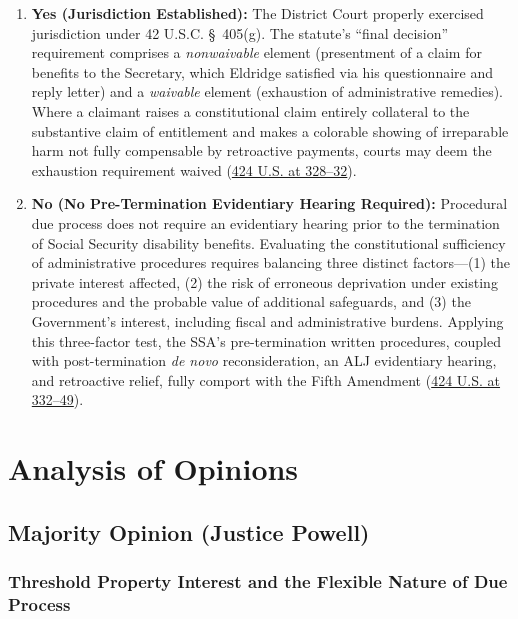 \documentclass[12pt]{article}
\begin{document}
\begin{enumerate}
    \item \textbf{Yes (Jurisdiction Established):} The District Court properly exercised jurisdiction under 42 U.S.C. \S~405(g). The statute's ``final decision'' requirement comprises a \emph{nonwaivable} element (presentment of a claim for benefits to the Secretary, which Eldridge satisfied via his questionnaire and reply letter) and a \emph{waivable} element (exhaustion of administrative remedies). Where a claimant raises a constitutional claim entirely collateral to the substantive claim of entitlement and makes a colorable showing of irreparable harm not fully compensable by retroactive payments, courts may deem the exhaustion requirement waived (\href{https://supreme.justia.com/cases/federal/us/424/319/}{424 U.S. at 328--32}).
    \item \textbf{No (No Pre-Termination Evidentiary Hearing Required):} Procedural due process does not require an evidentiary hearing prior to the termination of Social Security disability benefits. Evaluating the constitutional sufficiency of administrative procedures requires balancing three distinct factors---(1) the private interest affected, (2) the risk of erroneous deprivation under existing procedures and the probable value of additional safeguards, and (3) the Government's interest, including fiscal and administrative burdens. Applying this three-factor test, the SSA's pre-termination written procedures, coupled with post-termination \emph{de novo} reconsideration, an ALJ evidentiary hearing, and retroactive relief, fully comport with the Fifth Amendment (\href{https://supreme.justia.com/cases/federal/us/424/319/}{424 U.S. at 332--49}).
\end{enumerate}

\section{Analysis of Opinions}
\subsection{Majority Opinion (Justice Powell)}

\subsubsection{Threshold Property Interest and the Flexible Nature of Due Process}
\end{document}
